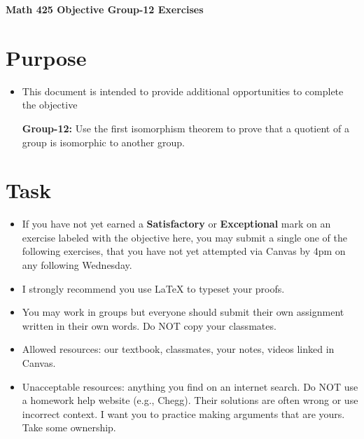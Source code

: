\documentclass[12pt]{article}
\begin{document}
	\begin{center}
		{\Large \bf Math 425 Objective Group-12 Exercises}
	\end{center}
	\section*{Purpose}
	\begin{itemize}
		\item This document is intended to provide additional opportunities to complete the objective
		
		\textbf{Group-12:} Use the first isomorphism theorem to prove that a quotient of a group is isomorphic to another group.
	\end{itemize}
	\section*{Task}
	\begin{itemize}
		\item If you have not yet earned a \textbf{Satisfactory} or \textbf{Exceptional} mark on an exercise labeled with the objective here, you may submit a single one of the following exercises, that you have not yet attempted via Canvas by 4pm on any following Wednesday.
		\item I strongly recommend you use LaTeX to typeset your proofs.
		\item You may work in groups but everyone should submit their own assignment written in their own words.  Do NOT copy your classmates.
		\item Allowed resources: our textbook, classmates, your notes, videos linked in Canvas.
		\item Unacceptable resources: anything you find on an internet search. Do NOT use a homework help website (e.g., Chegg). Their solutions are often wrong or use incorrect context.  I want you to practice making arguments that are yours. Take some ownership.
	\end{itemize}
\end{document}
